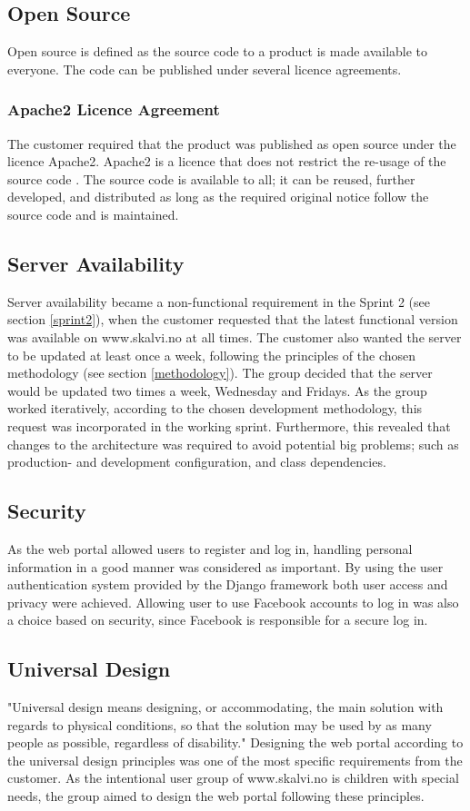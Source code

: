 \subsection{Open Source}
Open source is defined as the source code to a product is made available to everyone. The code can be published under several licence agreements.

\subsubsection{Apache2 Licence Agreement}
The customer required that the product was published as open source under the licence Apache2. Apache2 is a licence that does not restrict the re-usage of the source code \cite{apache2}. The source code is available to all; it can be reused, further developed, and distributed as long as the required original notice follow the source code and is maintained. 

\subsection{Server Availability}
Server availability became a non-functional requirement in the Sprint 2 (see section \ref{sprint2}), when the customer requested that the latest functional version was available on www.skalvi.no at all times. The customer also wanted the server to be updated at least once a week, following the principles of the chosen methodology (see section \ref{methodology}). The group decided that the server would be updated two times a week, Wednesday and Fridays. As the group worked iteratively, according to the chosen development methodology, this request was incorporated in the working sprint. Furthermore, this revealed that changes to the architecture was required to avoid potential big problems; such as production- and development configuration, and class dependencies.

\subsection{Security}
As the web portal allowed users to register and log in, handling personal information in a good manner was considered as important. By using the user authentication system provided by the Django framework both user access and privacy were achieved. Allowing user to use Facebook accounts to log in was also a choice based on security, since Facebook is responsible for a secure log in.


\subsection{Universal Design}
\label{universalDesign}
"Universal design means designing, or accommodating, the main solution with regards to physical conditions, so that the solution may be used by as many people as possible, regardless of disability." \cite{Difi} Designing the web portal according to the universal design principles was one of the most specific requirements from the customer. As the intentional user group of www.skalvi.no is children with special needs, the group aimed to design the web portal following these principles. 



